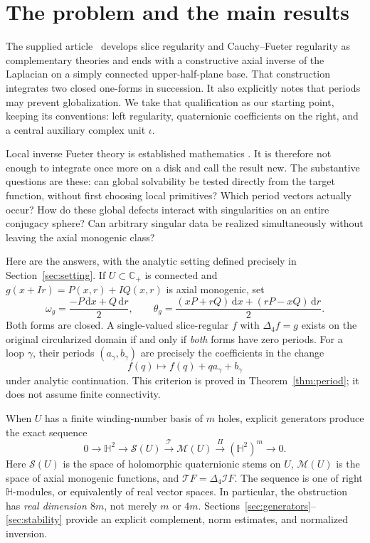 \documentclass[11pt,a4paper]{article}
\numberwithin{equation}{section}
\theoremstyle{definition}
\theoremstyle{remark}
\newcommand{\C}{\mathbb C}
\newcommand{\HH}{\mathbb H}
\newcommand{\Cp}{\C_+}
\newcommand{\cS}{\mathscr S}
\newcommand{\cM}{\mathscr M}
\newcommand{\cI}{\mathcal I}
\newcommand{\lap}{\Delta_4}
\newcommand{\T}{\mathcal T}
\newcommand{\dd}{\,\mathrm d}
\begin{document}
\section{The problem and the main results}
\label{sec:intro}

The supplied article~\cite{Source} develops slice regularity and Cauchy--Fueter
regularity as complementary theories and ends with a constructive axial inverse
of the Laplacian on a simply connected upper-half-plane base. That construction
integrates two closed one-forms in succession. It also explicitly notes that
periods may prevent globalization. We take that qualification as our starting
point, keeping its conventions: left regularity, quaternionic coefficients on
the right, and a central auxiliary complex unit $\iota$.

Local inverse Fueter theory is established mathematics
\cite{CSS,CPSS}. It is therefore not enough to integrate once more on a disk and
call the result new. The substantive questions are these: can global
solvability be tested directly from the target function, without first choosing
local primitives? Which period vectors actually occur? How do these global
defects interact with singularities on an entire conjugacy sphere? Can arbitrary
singular data be realized simultaneously without leaving the axial monogenic
class?

Here are the answers, with the analytic setting defined precisely in
Section~\ref{sec:setting}. If $U\subset\Cp$ is connected and
$g(x+Ir)=P(x,r)+IQ(x,r)$ is axial monogenic, set
\begin{equation}
 \omega_g=\frac{-P\dd x+Q\dd r}{2},\qquad
 \theta_g=\frac{(xP+rQ)\dd x+(rP-xQ)\dd r}{2}.
 \label{eq:forms-intro}
\end{equation}
Both forms are closed. A single-valued slice-regular $f$ with $\lap f=g$ exists
on the original circularized domain if and only if \emph{both} forms have zero
periods. For a loop $\gamma$, their periods $(a_\gamma,b_\gamma)$ are precisely
the coefficients in the change
\[
 f(q)\longmapsto f(q)+q a_\gamma+b_\gamma
\]
under analytic continuation. This criterion is proved in
Theorem~\ref{thm:period}; it does not assume finite connectivity.

When $U$ has a finite winding-number basis of $m$ holes, explicit generators
produce the exact sequence
\begin{equation}
 0\longrightarrow\HH^2\longrightarrow\cS(U)
 \xrightarrow{\ \T\ }\cM(U)
 \xrightarrow{\ \Pi\ }(\HH^2)^m\longrightarrow0.
 \label{eq:sequence-intro}
\end{equation}
Here $\cS(U)$ is the space of holomorphic quaternionic stems on $U$,
$\cM(U)$ is the space of axial monogenic functions, and $\T F=\lap\cI F$.
The sequence is one of right $\HH$-modules, or equivalently of real vector
spaces. In particular, the obstruction has \emph{real dimension $8m$}, not
merely $m$ or $4m$. Sections~\ref{sec:generators}--\ref{sec:stability} provide
an explicit complement, norm estimates, and normalized inversion.
\end{document}
